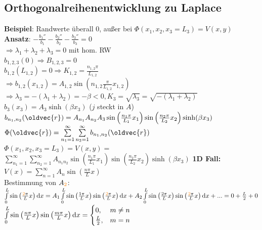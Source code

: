 \documentclass[6pt,a4paper]{scrartcl}
\let\vec\oldvec
\begin{document}
\begin{multicols}{4}
	\subsection{Orthogonalreihenentwicklung zu Laplace}
	\textbf{Beispiel}: Randwerte überall 0, außer bei $\Phi(x_1,x_2,x_3=L_3)=V(x,y)$\\
	\textbf{Ansatz}: $-\frac{b_1''}{b_1} -\frac{b_2''}{b_2}-\frac{b_3''}{b_3}=0$\\
	$\Rightarrow \lambda_1+\lambda_2+\lambda_3 = 0$ mit hom. RW\\
	$b_{1,2,3}(0)\Rightarrow B_{1,2,3}=0$\\
	$b_{1,2}(L_{1,2})=0\Rightarrow K_{1,2}=\frac{n_{1,2}\pi}{L_{1,2}}$\\
	$\Rightarrow b_{1,2}(x_{1,2}) = A_{1,2}\sin\left(n_{1,2}\frac{\pi}{L_{1,2}}x_{1,2}\right)$\\
	$\Rightarrow \lambda_3 = -(\lambda_1+\lambda_2) = -\beta < 0, K_3=\sqrt{\lambda_3}=\sqrt{-(\lambda_1+\lambda_2)}$\\
	$b_3(x_3)=A_3\sinh(\beta x_3)$ ($j$ steckt in $A$)\\
	$b_{n_1,n_2}(\vec{r}) = A_{n_1}A_{n_2}A_3\sin\left(\frac{n_1\pi}{L_1}x_1\right)\sin\left(\frac{n_2\pi}{L_2}x_2\right)\sinh(\beta x_3)$\\
	$\Phi(\vec{r}) = \sum\limits_{n_1=1}^{\infty}\sum\limits_{n_2=1}^{\infty}b_{n_1,n_2}(\vec{r})$\\
	$\Phi(x_1,x_2,x_3=L_3)=V(x,y)=$\\$\sum\limits_{n_1=1}^{\infty}\sum\limits_{n_2=1}^{\infty}A_{n_1n_2}\sin\left(\frac{n_1\pi}{L_1}x_1\right)\sin\left(\frac{n_2\pi}{L_2}x_2\right)\sinh(\beta x_3)$
	\textbf{1D Fall:} $V(x)=\sum\limits_{n=1}^{\infty}A_n\sin\left(\frac{n\pi}{L}x\right)$\\
	Bestimmung von $A_{\textcolor{orange}{2}}$:\\
	$\int\limits_0^{L}\sin\left(\frac{\textcolor{orange}{2}\pi}{L}x\right)\diff x = A_1\int\limits_0^{L}\sin\left(\frac{1\pi}{L}x\right)\sin\left(\frac{\textcolor{orange}{2}\pi}{L}x\right)\diff x + A_2\int\limits_0^{L}\sin\left(\frac{2\pi}{L}x\right)\sin\left(\frac{\textcolor{orange}{2}\pi}{L}x\right)\diff x + ... = 0 + \frac{L}{2} + 0$\\
	$\int\limits_0^{L}\sin\left(\frac{n\pi}{L}x\right)\sin\left(\frac{m\pi}{L}x\right)\diff x = \begin{cases}0, &m\neq n\\\frac{L}{2}, &m=n\end{cases}$\\

\end{multicols}
\end{document}
